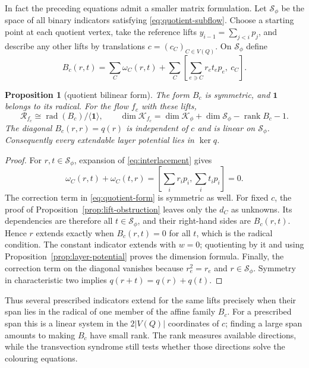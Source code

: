 \documentclass[11pt,a4paper]{article}
\newtheorem{proposition}[theorem]{Proposition}
\theoremstyle{definition}
\theoremstyle{remark}
\begin{document}
In fact the preceding equations admit a smaller matrix formulation.  Let $\mathcal S_\phi$ be the space of all binary indicators satisfying \eqref{eq:quotient-subflow}.  Choose a starting point at each quotient vertex, take the reference lifts $y_{i-1}=\sum_{j<i}p_j$, and describe any other lifts by translations $c=(c_C)_{C\in V(Q)}$.  On $\mathcal S_\phi$ define
\begin{equation}\label{eq:quotient-form}
 B_c(r,t)=\sum_C\omega_C(r,t)
   +\sum_C\left[\sum_{e\ni C}r_et_ep_e,\ c_C\right].
\end{equation}

\begin{proposition}[quotient bilinear form]\label{prop:quotient-form}
The form $B_c$ is symmetric, and $\boldsymbol1$ belongs to its radical.  For the flow $f_c$ with these lifts,
\[
 \mathcal R_{f_c}\cong\operatorname{rad}(B_c)/\langle\boldsymbol1\rangle,
 \qquad
 \dim\mathcal K_{f_c}=\dim\mathcal K_\phi+
 \dim\mathcal S_\phi-\operatorname{rank} B_c-1.
\]
The diagonal $B_c(r,r)=q(r)$ is independent of $c$ and is linear on $\mathcal S_\phi$.  Consequently every extendable layer potential lies in $\ker q$.
\end{proposition}
\begin{proof}
For $r,t\in\mathcal S_\phi$, expansion of \eqref{eq:interlacement} gives
\[
 \omega_C(r,t)+\omega_C(t,r)
 =\left[\sum_i r_i p_i,\sum_i t_i p_i\right]=0.
\]
The correction term in \eqref{eq:quotient-form} is symmetric as well.  For fixed $c$, the proof of Proposition~\ref{prop:lift-obstruction} leaves only the $d_C$ as unknowns.  Its dependencies are therefore all $t\in\mathcal S_\phi$, and their right-hand sides are $B_c(r,t)$.  Hence $r$ extends exactly when $B_c(r,t)=0$ for all $t$, which is the radical condition.  The constant indicator extends with $w=0$; quotienting by it and using Proposition~\ref{prop:layer-potential} proves the dimension formula.  Finally, the correction term on the diagonal vanishes because $r_e^2=r_e$ and $r\in\mathcal S_\phi$.  Symmetry in characteristic two implies $q(r+t)=q(r)+q(t)$.
\end{proof}

Thus several prescribed indicators extend for the same lifts precisely when their span lies in the radical of one member of the affine family $B_c$.  For a prescribed span this is a linear system in the $2|V(Q)|$ coordinates of $c$; finding a large span amounts to making $B_c$ have small rank.  The rank measures available directions, while the transvection syndrome still tests whether those directions solve the colouring equations.
\end{document}

